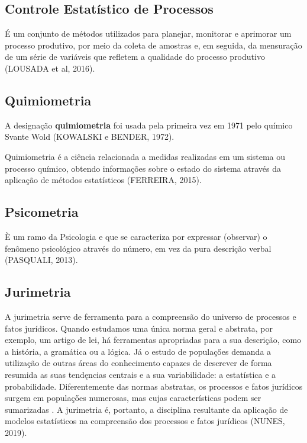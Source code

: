 \subsection{Controle Estatístico de Processos} 

É um conjunto de métodos utilizados para planejar, monitorar e aprimorar um processo produtivo, por meio da coleta de amostras e, em seguida, da mensuração de um série de variáveis que refletem a qualidade do processo produtivo (LOUSADA et al, 2016).\vskip0.3cm


\newpage
\subsection{Quimiometria} 

A designação \textbf{quimiometria} foi usada pela primeira vez em 1971 pelo químico Svante Wold (KOWALSKI e BENDER, 1972).
\vskip0.3cm

Quimiometria é a ciência relacionada a medidas realizadas em um sistema ou processo químico, obtendo informações sobre o estado do sistema através da aplicação de métodos estatísticos (FERREIRA, 2015).\vskip0.3cm

\subsection{Psicometria} 

È um ramo da Psicologia e que se caracteriza por expressar (observar) o fenômeno psicológico através do número, em vez da pura descrição verbal (PASQUALI, 2013). \vskip0.3cm

\subsection{Jurimetria} 

A jurimetria serve de ferramenta para a compreensão do universo de processos e fatos jurídicos. Quando estudamos uma única norma geral e abstrata, por exemplo, um artigo de lei, há ferramentas apropriadas para a sua descrição, como a história, a gramática ou a lógica. Já o estudo de populaçőes demanda a utilização de outras áreas do conhecimento capazes de descrever de forma resumida as suas tendęncias centrais e a sua variabilidade: a estatística e a probabilidade. Diferentemente das normas abstratas, os processos e fatos jurídicos surgem em populaçőes numerosas, mas cujas características podem ser sumarizadas . A jurimetria é, portanto, a disciplina resultante da aplicação de modelos estatísticos na compreensão dos processos e fatos jurídicos (NUNES, 2019).


